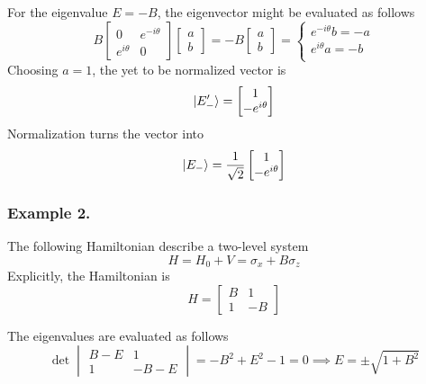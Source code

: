 \documentclass[../../../main.tex]{subfiles}
\begin{document}
For the eigenvalue $E=-B$, the eigenvector might be evaluated as follows
\begin{equation*}
    B \begin{bmatrix}
        0           & e^{-i\theta} \\
        e^{i\theta} & 0
    \end{bmatrix}
    \begin{bmatrix}
        a \\
        b
    \end{bmatrix}
    = - B
    \begin{bmatrix}
        a \\
        b
    \end{bmatrix}
    = \begin{cases}
        e^{-i\theta}b =- a \\
        e^{i\theta}a = -b  \\
    \end{cases}
\end{equation*}
Choosing $a=1$, the yet to be normalized vector is
\begin{equation*}
    \ket{E_-'} =
    \begin{bmatrix}
        1 \\-e^{i\theta}
    \end{bmatrix}
\end{equation*}
Normalization turns the vector into
\begin{equation*}
    \ket{E_-} =
    \frac{1 }{\sqrt{2}}
    \begin{bmatrix}
        1 \\-e^{i\theta}
    \end{bmatrix}
\end{equation*}

\subsubsection{Example 2.}
The following Hamiltonian describe a two-level system
\begin{equation*}
    H = H_0+V = \sigma_x + B \sigma_z
\end{equation*}
Explicitly, the Hamiltonian is
\begin{equation*}
    H =
    \begin{bmatrix}
        B & 1  \\
        1 & -B
    \end{bmatrix}
\end{equation*}

The eigenvalues are evaluated as follows
\begin{equation*}
    \det
    \begin{vmatrix}
        B-E & 1    \\
        1   & -B-E
    \end{vmatrix}
    = -B^2 + E^2 - 1 = 0
    \implies E = \pm \sqrt{1+B^2 }
\end{equation*}
\end{document}
